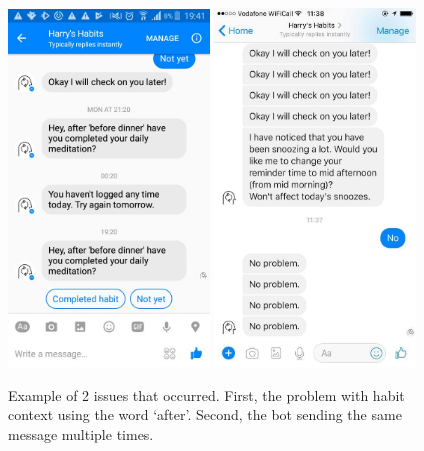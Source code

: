 \begin{figure}[H]
  \centering
  \includegraphics[width=2.1in]{../resources/feedback/after-before.jpg}
  \hspace{10px}
  \includegraphics[width=2.1in]{../resources/feedback/double-messages.jpg}
  \caption{Example of 2 issues that occurred. First, the problem with habit context using the word `after'. Second, the bot sending the same message multiple times.}
  \label{fig:study_bot_issues}
\end{figure}

